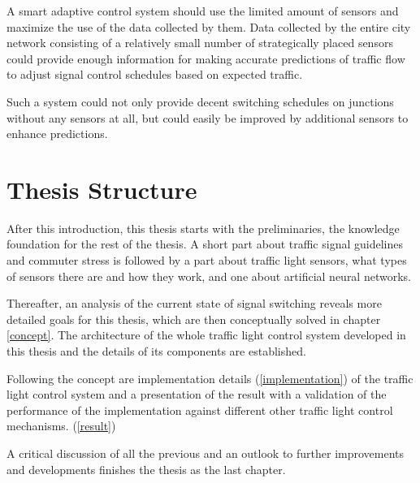 A smart adaptive control system should use the limited amount of sensors and maximize the use of the data collected by them. Data collected by the entire city network consisting of a relatively small number of strategically placed sensors could provide enough information for making accurate predictions of traffic flow to adjust signal control schedules based on expected traffic.

Such a system could not only provide decent switching schedules on junctions without any sensors at all, but could easily be improved by additional sensors to enhance predictions.

\newpage

\section{Thesis Structure}

After this introduction, this thesis starts with the preliminaries, the knowledge foundation for the rest of the thesis. A short part about traffic signal guidelines and commuter stress is followed by a part about traffic light sensors, what types of sensors there are and how they work, and one about artificial neural networks.

Thereafter, an analysis of the current state of signal switching reveals more detailed goals for this thesis, which are then conceptually solved in chapter \ref{concept}. The architecture of the whole traffic light control system developed in this thesis and the details of its components are established.

Following the concept are implementation details (\ref{implementation}) of the traffic light control system and a presentation of the result with a validation of the performance of the implementation against different other traffic light control mechanisms. (\ref{result})

A critical discussion of all the previous and an outlook to further improvements and developments finishes the thesis as the last chapter.